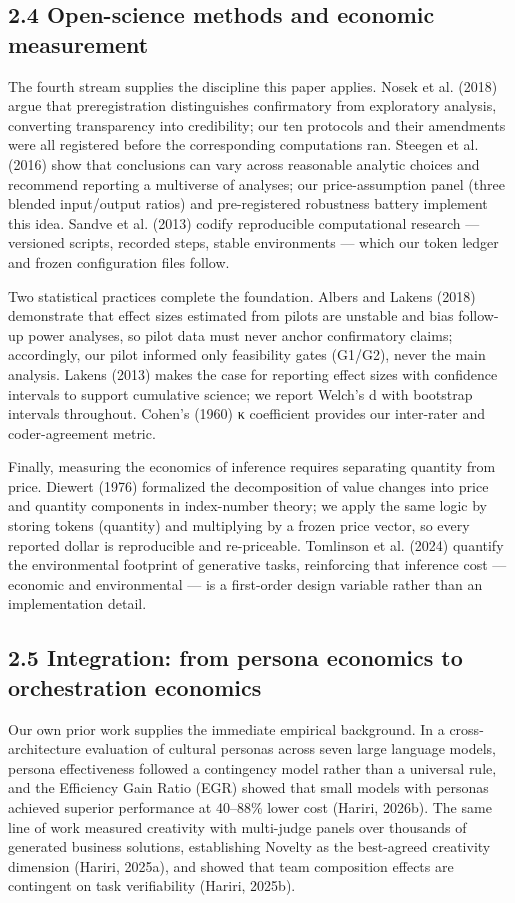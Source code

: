 \documentclass[11pt,a4paper]{article}
\begin{document}
\subsection{2.4 Open-science methods and economic measurement}

The fourth stream supplies the discipline this paper applies. Nosek et al.
(2018) argue that preregistration distinguishes confirmatory from
exploratory analysis, converting transparency into credibility; our ten
protocols and their amendments were all registered before the corresponding
computations ran. Steegen et al. (2016) show that conclusions can vary
across reasonable analytic choices and recommend reporting a multiverse of
analyses; our price-assumption panel (three blended input/output ratios)
and pre-registered robustness battery implement this idea. Sandve et al.
(2013) codify reproducible computational research — versioned scripts,
recorded steps, stable environments — which our token ledger and frozen
configuration files follow.

Two statistical practices complete the foundation. Albers and Lakens
(2018) demonstrate that effect sizes estimated from pilots are unstable and
bias follow-up power analyses, so pilot data must never anchor confirmatory
claims; accordingly, our pilot informed only feasibility gates (G1/G2), never
the main analysis. Lakens (2013) makes the case for reporting effect sizes
with confidence intervals to support cumulative science; we report Welch's d
with bootstrap intervals throughout. Cohen's (1960) κ coefficient provides
our inter-rater and coder-agreement metric.

Finally, measuring the economics of inference requires separating quantity
from price. Diewert (1976) formalized the decomposition of value changes
into price and quantity components in index-number theory; we apply the same
logic by storing tokens (quantity) and multiplying by a frozen price vector,
so every reported dollar is reproducible and re-priceable. Tomlinson et al.
(2024) quantify the environmental footprint of generative tasks, reinforcing
that inference cost — economic and environmental — is a first-order design
variable rather than an implementation detail.

\subsection{2.5 Integration: from persona economics to orchestration economics}

Our own prior work supplies the immediate empirical background. In a
cross-architecture evaluation of cultural personas across seven large
language models, persona effectiveness followed a contingency model rather
than a universal rule, and the Efficiency Gain Ratio (EGR) showed that small
models with personas achieved superior performance at 40–88\% lower cost
(Hariri, 2026b). The same line of work measured creativity with multi-judge
panels over thousands of generated business solutions, establishing
Novelty as the best-agreed creativity dimension (Hariri, 2025a), and showed
that team composition effects are contingent on task verifiability
(Hariri, 2025b).
\end{document}
